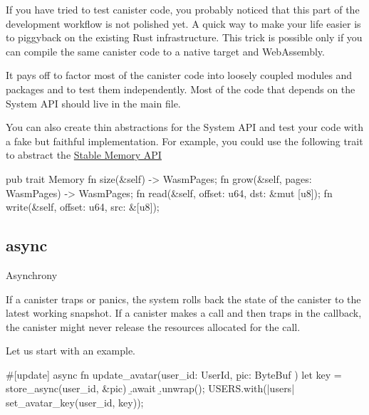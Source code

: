 \documentclass{article}
\begin{document}
If you have tried to test canister code, you probably noticed that this part of the development workflow is not polished yet.
A quick way to make your life easier is to piggyback on the existing Rust infrastructure.
This trick is possible only if you can compile the same canister code to a native target and WebAssembly.


It pays off to factor most of the canister code into loosely coupled modules and packages and to test them independently.
Most of the code that depends on the System API should live in the main file.

You can also create thin abstractions for the System API and test your code with a fake but faithful implementation.
For example, you could use the following trait to abstract the \href{https://sdk.dfinity.org/docs/interface-spec/index.html#system-api-stable-memory}{Stable Memory API}

\begin{code}[good]
pub trait Memory {
    fn size(&self) -> WasmPages;
    fn grow(&self, pages: WasmPages) -> WasmPages;
    fn read(&self, offset: u64, dst: &mut [u8]);
    fn write(&self, offset: u64, src: &[u8]);
}
\end{code}

\subsection{async}{Asynchrony}

If a canister traps or panics, the system rolls back the state of the canister to the latest working snapshot.
If a canister makes a call and then traps in the callback, the canister might never release the resources allocated for the call.


Let us start with an example.

\begin{code}[bad]
#[update]
async fn update_avatar(user_id: UserId, \b{pic: ByteBuf}  ) {
    let key = store_async(user_id, &pic)
                  \b{.await}      
                  \b{.unwrap()};  
    USERS.with(|users| set_avatar_key(user_id, key));
}
\end{code}
\end{document}
